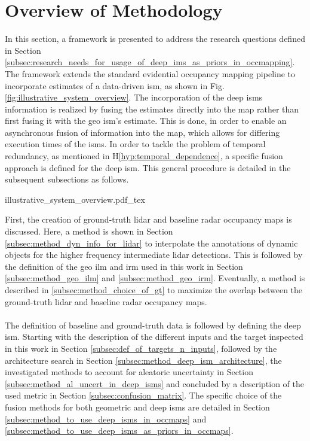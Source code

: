 \section{Overview of Methodology}
\label{sec:framework_overview}
In this section, a framework is presented to address the research questions defined in Section \ref{subsec:research_needs_for_usage_of_deep_ims_as_priors_in_occmapping}. The framework extends the standard evidential occupancy mapping pipeline \cite{pagac1996evidential} to incorporate estimates of a data-driven \gls{ism}, as shown in Fig. \ref{fig:illustrative_system_overview}. The incorporation of the deep \gls{ism}s information is realized by fusing the estimates directly into the map rather than first fusing it with the geo \gls{ism}'s estimate. This is done, in order to enable an asynchronous fusion of information into the map, which allows for differing execution times of the \gls{ism}s. In order to tackle the problem of temporal redundancy, as mentioned in H\ref{hyp:temporal_dependence}, a specific fusion approach is defined for the deep \gls{ism}. This general procedure is detailed in the subsequent subsections as follows.
\begin{center}
	{illustrative_system_overview.pdf_tex}
\end{center}
First, the creation of ground-truth lidar and baseline radar occupancy maps is discussed. Here, a method is shown in Section \ref{subsec:method_dyn_info_for_lidar} to interpolate the annotations of dynamic objects for the higher frequency intermediate lidar detections. This is followed by the definition of the geo \gls{ilm} and \gls{irm} used in this work in Section \ref{subsec:method_geo_ilm} and \ref{subsec:method_geo_irm}. Eventually, a method is described in \ref{subsec:method_choice_of_gt} to maximize the overlap between the ground-truth lidar and baseline radar occupancy maps.
\\\\
The definition of baseline and ground-truth data is followed by defining the deep \gls{ism}. Starting with the description of the different inputs and the target inspected in this work in Section \ref{subsec:def_of_targets_n_inputs}, followed by the architecture search in Section \ref{subsec:method_deep_ism_architecture}, the investigated methods to account for aleatoric uncertainty in Section \ref{subsec:method_al_uncert_in_deep_isms} and concluded by a description of the used metric in Section \ref{subsec:confusion_matrix}. The specific choice of the fusion methods for both geometric and deep \gls{ism}s are detailed in Section \ref{subsec:method_to_use_deep_isms_in_occmaps} and \ref{subsec:method_to_use_deep_isms_as_priors_in_occmaps}.
%
